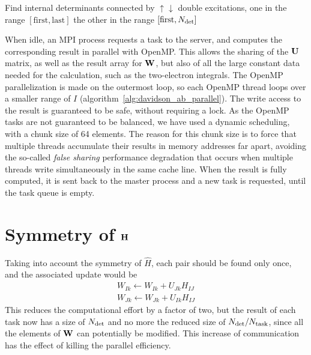\documentclass[./thesis.tex]{subfiles}
\begin{document}
\begin{algorithm}
\caption{Find internal determinants connected by $\uparrow\downarrow$ double excitations, one in the range $[\text{first}, \text{last}]$ the other in the range $[\text{first}, {N_\text{det}}]$}
\label{alg:davidson_ab_parallel}
\end{algorithm}

When idle, an MPI process requests a task to the server, and computes the
corresponding result in parallel with OpenMP.\cite{openmp} This allows
the sharing of the $\mathbf{U}$ matrix, as well as the result array for $\mathbf{W}$,
but also of all the large constant data needed for the calculation, such as
the two-electron integrals.
The OpenMP parallelization is made on the outermost loop, so each OpenMP thread
loops over a smaller range of $I$ (algorithm~\ref{alg:davidson_ab_parallel}).
The write
access to the result is guaranteed to be safe, without requiring a lock.
As the OpenMP tasks are not guaranteed to be balanced, we have used a
dynamic scheduling, with a chunk size of 64 elements. The reason for this
chunk size is to force that multiple threads accumulate their results in 
memory addresses far apart, avoiding the so-called \emph{false sharing}
performance degradation that occurs when multiple threads write simultaneously
in the same cache line.\cite{Bolosky1993Sep} 
When the result is fully computed, it is sent back to the master process and
a new task is requested, until the task queue is empty.


\section{Symmetry of $\mathbf{H}$}


Taking into account the symmetry of $\widehat H$, each pair should be found only once, and the associated update would be
\begin{align}
W_{Ik} \gets W_{Ik} + U_{Jk} H_{IJ} \\
W_{Jk} \gets W_{Jk} + U_{Ik} H_{IJ}
\end{align}
This reduces the computational effort by a factor of two, but the result of
each task now has a size of ${N_\text{det}}$ and no more the reduced size of ${N_\text{det}} / N_\text{task}$,
since all the elements of $\mathbf{W}$ can potentially be modified.
This increase of communication has the effect of killing the parallel
efficiency.
\end{document}
